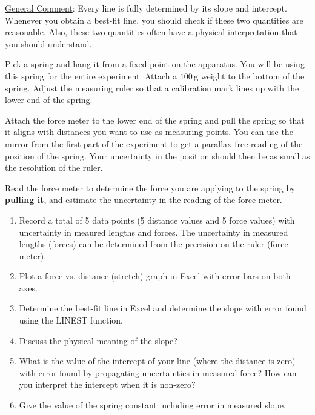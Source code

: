 \underline{General Comment}: Every line is fully determined by its slope and intercept. Whenever you obtain a best-fit line, you should check if these two quantities are reasonable. Also, these two quantities often have a physical interpretation that you should understand. \myskip

Pick a spring and hang it from a fixed point on the apparatus. You will be using this spring for the entire experiment. Attach a $100\,\mathrm{g}$ weight to the bottom of the spring. Adjust the measuring ruler so that a calibration mark lines up with the lower end of the spring. \myskip

Attach the force meter to the lower end of the spring and pull the spring so that it aligns with distances you want to use as measuring points. You can use the mirror from the first part of the experiment to get a parallax-free reading of the position of the spring. Your uncertainty in the position should then be as small as the resolution of the ruler. \myskip

Read the force meter to determine the force you are applying to the spring by {\bf{pulling it}}, and estimate the uncertainty in the reading of the force meter.

\begin{enumerate}
    \item Record a total of 5 data points (5 distance values and 5 force values) with uncertainty in meaured lengths and forces. The uncertainty in measured lengths (forces) can be determined from the precision on the ruler (force meter).
    \item Plot a force vs. distance (stretch) graph in Excel with error bars on both axes.
    \item Determine the best-fit line in Excel and determine the slope with error found using the LINEST function.
    \item Discuss the physical meaning of the slope?
    \item What is the value of the intercept of your line (where the distance is zero) with error found by propagating uncertainties in measured force?  How can you interpret the intercept when it is non-zero?
    \item Give the value of the spring constant including error in measured slope.
\end{enumerate}

